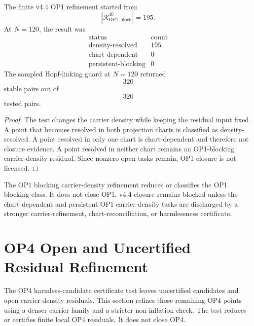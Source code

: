 \begin{proposition}
The finite v4.4 OP1 refinement started from
\[
    |\mathcal R_{\mathrm{OP1,block}}^{40}|=195.
\]
At \(N=120\), the result was
\[
\begin{array}{c|r}
\text{status} & \text{count}\\
\hline
\mathrm{density\text{-}resolved} & 195\\
\mathrm{chart\text{-}dependent} & 0\\
\mathrm{persistent\text{-}blocking} & 0
\end{array}
\]
The sampled Hopf-linking guard at \(N=120\) returned
\[
    320
\]
stable pairs out of
\[
    320
\]
tested pairs.
\end{proposition}

\begin{proof}
The test changes the carrier density while keeping the residual input fixed.
A point that becomes resolved in both projection charts is classified as
density-resolved.  A point resolved in only one chart is chart-dependent and
therefore not closure evidence.  A point resolved in neither chart remains an
OP1-blocking carrier-density residual.  Since nonzero open tasks remain, OP1
closure is not licensed.
\end{proof}

\begin{theorem}
The OP1 blocking carrier-density refinement reduces or classifies the OP1
blocking class.  It does not close OP1.  v4.4 closure remains blocked unless
the chart-dependent and persistent OP1 carrier-density tasks are discharged by
a stronger carrier-refinement, chart-reconciliation, or harmlessness
certificate.
\end{theorem}



\section{OP4 Open and Uncertified Residual Refinement}
\label{sec:v44-op4-open-uncertified-residual-refinement}

The OP4 harmless-candidate certificate test leaves uncertified candidates and
open carrier-density residuals.  This section refines those remaining OP4
points using a denser carrier family and a stricter non-inflation check.  The
test reduces or certifies finite local OP4 residuals.  It does not close OP4.

